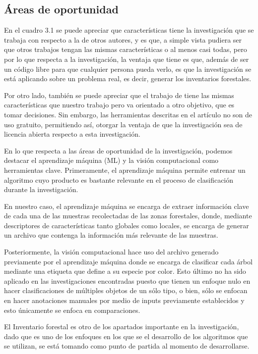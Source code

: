 \subsection{Áreas de oportunidad}
En el cuadro 3.1 se puede apreciar que características tiene la investigación que se trabaja con respecto a la de otros autores, y es que, a simple vista pudiera ser que otros trabajos tengan las mismas características o al menos casi todas, pero por lo que respecta a la investigación, la ventaja que tiene es que, además de ser un código libre para que cualquier persona pueda verlo, es que la investigación se está aplicando sobre un problema real, es decir, generar los inventarios forestales. 

\newpage
Por otro lado, también se puede apreciar que el trabajo de \cite{rf10} tiene las mismas características que nuestro trabajo pero va orientado a otro objetivo, que es tomar decisiones. Sin embargo, las herramientas descritas en el artículo no son de uso gratuito, permitiendo así, otorgar la ventaja de que la investigación sea de licencia abierta respecto a esta investigación.

En lo que respecta a las áreas de oportunidad de la investigación, podemos destacar el aprendizaje máquina (ML) y la visión computacional como herramientas clave. Primeramente, el aprendizaje máquina permite entrenar un algoritmo cuyo producto es bastante relevante en el proceso de clasificación durante la investigación.

En nuestro caso, el aprendizaje máquina se encarga de extraer información clave de cada una de las muestras recolectadas de las zonas forestales, donde, mediante descriptores de características tanto globales como locales, se encarga de generar un archivo que contenga la información más relevante de las muestras.

Posteriormente, la visión computacional hace uso del archivo generado previamente por el aprendizaje máquina donde se encarga de clasificar cada árbol mediante una etiqueta que define a su especie por color. Esto último no ha sido aplicado en las investigaciones encontradas puesto que tienen un enfoque nulo en hacer clasificaciones de múltiples objetos de un sólo tipo, o bien, sólo se enfocan en hacer anotaciones manuales por medio de inputs previamente establecidos y esto únicamente se enfoca en comparaciones.

El Inventario forestal es otro de los apartados importante en la investigación, dado que es uno de los enfoques en los que se el desarrollo de los algoritmos que se utilizan, se está tomando como punto de partida al momento de desarrollarse. 

